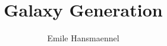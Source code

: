 \documentclass[a2, plainboxedsections, final]{sciposter}
\title{Galaxy Generation}               %
\author{Emile Hansmaennel}              %
\institute{Theodor Fliedner Gymnasium}  %
\begin{document}
  \maketitle

  \begin{multicols}{2}

  
  
  
  
  
  
  
  
  
  
  
  
  
  

  \end{multicols}
\end{document}
